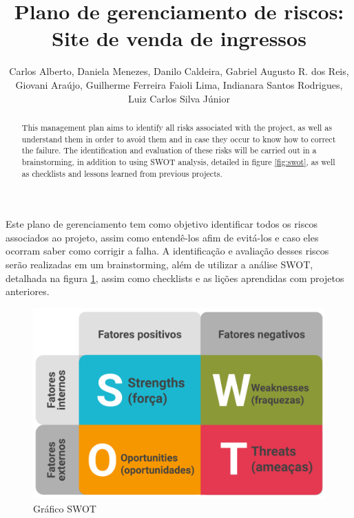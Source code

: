 \documentclass[12pt]{article}
\title{Plano de gerenciamento de riscos:\\Site de venda de ingressos}
\author{
    \begin{minipage}{\textwidth}
        Carlos Alberto\inst{1},
        Daniela Menezes\inst{2},
        Danilo Caldeira\inst{3},
        Gabriel Augusto R. dos Reis\inst{4},
        Giovani Araújo\inst{5},
        Guilherme Ferreira Faioli Lima\inst{6},
        Indianara Santos Rodrigues\inst{7},
        Luiz Carlos Silva Júnior\inst{8}
    \end{minipage}
}
\begin{document}
    \maketitle

    \begin{abstract}
        This management plan aims to identify all risks associated with the project, as well as understand them in order to avoid them and in case they occur to know how to correct the failure. The identification and evaluation of these risks will be carried out in a brainstorming, in addition to using SWOT analysis, detailed in figure \ref{fig:swot}, as well as checklists and lessons learned from previous projects.
    \end{abstract}

    \begin{resumo}
        Este plano de gerenciamento tem como objetivo identificar todos os riscos associados ao projeto, assim como entendê-los afim de evitá-los e caso eles ocorram saber como corrigir a falha. A identificação e avaliação desses riscos serão realizadas em um brainstorming, além de utilizar a análise SWOT, detalhada na figura \ref{fig:swot}, assim como checklists e as lições aprendidas com projetos anteriores.
    \end{resumo}
    
\tableofcontents
\newpage

    \begin{figure}[ht]
        \centering
        \includegraphics[scale=0.3]{./Images/swot.png}
        \caption{Gráfico SWOT}
        \label{fig:swot}
    \end{figure}
\end{document}
